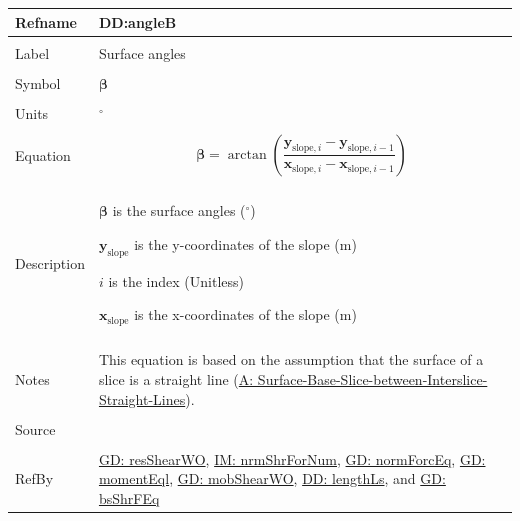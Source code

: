 \documentclass[12pt]{article}
\begin{document}
\vspace{\baselineskip}
\noindent
\begin{minipage}{\textwidth}
\begin{tabular}{>{\raggedright}p{}>{\raggedright\arraybackslash}p{}}
\toprule \textbf{Refname} & \textbf{DD:angleB}
\label{DD:angleB}
\\ \midrule \\
Label & Surface angles
        
\\ \midrule \\
Symbol & $\mathbf{β}$
         
\\ \midrule \\
Units & ${}^{\circ}$
        
\\ \midrule \\
Equation & \begin{displaymath}
           \mathbf{β}=\arctan\left(\frac{{\mathbf{y}_{\text{slope},i}}-{\mathbf{y}_{\text{slope},i-1}}}{{\mathbf{x}_{\text{slope},i}}-{\mathbf{x}_{\text{slope},i-1}}}\right)
           \end{displaymath}
\\ \midrule \\
Description & \begin{symbDescription}
              \item{$\mathbf{β}$ is the surface angles (${}^{\circ}$)}
              \item{${\mathbf{y}_{\text{slope}}}$ is the y-coordinates of the slope (m)}
              \item{$i$ is the index (Unitless)}
              \item{${\mathbf{x}_{\text{slope}}}$ is the x-coordinates of the slope (m)}
              \end{symbDescription}
\\ \midrule \\
Notes & This equation is based on the assumption that the surface of a slice is a straight line (\hyperref[assumpSBSBISL]{A: Surface-Base-Slice-between-Interslice-Straight-Lines}).
        
\\ \midrule \\
Source & \cite{fredlund1977}
         
\\ \midrule \\
RefBy & \hyperref[GD:resShearWO]{GD: resShearWO}, \hyperref[IM:nrmShrForNum]{IM: nrmShrForNum}, \hyperref[GD:normForcEq]{GD: normForcEq}, \hyperref[GD:momentEql]{GD: momentEql}, \hyperref[GD:mobShearWO]{GD: mobShearWO}, \hyperref[DD:lengthLs]{DD: lengthLs}, and \hyperref[GD:bsShrFEq]{GD: bsShrFEq}
        
\\ \bottomrule
\end{tabular}
\end{minipage}
\end{document}
